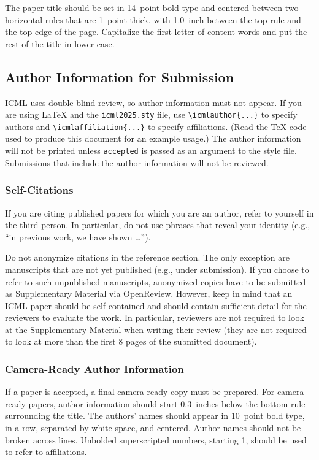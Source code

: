 \documentclass{article}
\theoremstyle{plain}
\theoremstyle{definition}
\theoremstyle{remark}
\begin{document}
The paper title should be set in 14~point bold type and centered
between two horizontal rules that are 1~point thick, with 1.0~inch
between the top rule and the top edge of the page. Capitalize the
first letter of content words and put the rest of the title in lower
case.

\subsection{Author Information for Submission}
\label{author info}

ICML uses double-blind review, so author information must not appear. If
you are using \LaTeX\/ and the \texttt{icml2025.sty} file, use
\verb+\icmlauthor{...}+ to specify authors and \verb+\icmlaffiliation{...}+ to specify affiliations. (Read the TeX code used to produce this document for an example usage.) The author information
will not be printed unless \texttt{accepted} is passed as an argument to the
style file.
Submissions that include the author information will not
be reviewed.

\subsubsection{Self-Citations}

If you are citing published papers for which you are an author, refer
to yourself in the third person. In particular, do not use phrases
that reveal your identity (e.g., ``in previous work, we
have shown \ldots'').

Do not anonymize citations in the reference section. The only exception are manuscripts that are
not yet published (e.g., under submission). If you choose to refer to
such unpublished manuscripts, anonymized copies have
to be submitted
as Supplementary Material via OpenReview\@. However, keep in mind that an ICML
paper should be self contained and should contain sufficient detail
for the reviewers to evaluate the work. In particular, reviewers are
not required to look at the Supplementary Material when writing their
review (they are not required to look at more than the first $8$ pages of the submitted document).

\subsubsection{Camera-Ready Author Information}
\label{final author}

If a paper is accepted, a final camera-ready copy must be prepared.
%
For camera-ready papers, author information should start 0.3~inches below the
bottom rule surrounding the title. The authors' names should appear in 10~point
bold type, in a row, separated by white space, and centered. Author names should
not be broken across lines. Unbolded superscripted numbers, starting 1, should
be used to refer to affiliations.
\end{document}
